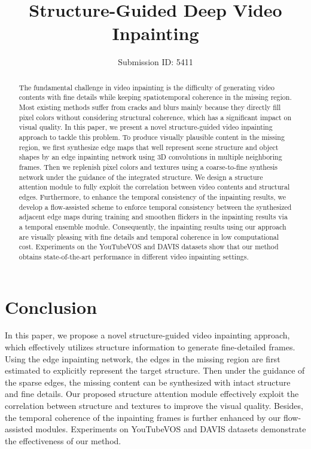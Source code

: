 \documentclass[letterpaper]{article} %
\title{Structure-Guided Deep Video Inpainting}
\author{Submission ID: 5411}
\begin{document}
\maketitle

\begin{abstract}
The fundamental challenge in video inpainting is the difficulty of generating video contents with fine details while keeping spatiotemporal coherence in the missing region. 
Most existing methods suffer from cracks and blurs mainly because they directly fill pixel colors without considering structural coherence, which has a significant impact on visual quality. 
In this paper, we present a novel structure-guided video inpainting approach to tackle this problem. 
To produce visually plausible content in the missing region, we first synthesize edge maps that well represent scene structure and object shapes by an edge inpainting network using 3D convolutions in multiple neighboring frames. 
Then we replenish pixel colors and textures using a coarse-to-fine synthesis network under the guidance of the integrated structure. 
We design a structure attention module to fully exploit the correlation between video contents and structural edges. 
Furthermore, to enhance the temporal consistency of the inpainting results, we develop a flow-assisted scheme to enforce temporal consistency between the synthesized adjacent edge maps during training and smoothen flickers in the inpainting results via a temporal ensemble module. 
Consequently, the inpainting results using our approach are visually pleasing with fine details and temporal coherence in low computational cost. 
Experiments on the YouTubeVOS and DAVIS datasets show that our method obtains state-of-the-art performance in different video inpainting settings.

\end{abstract}


 





\section{Conclusion}
In this paper, we propose a novel structure-guided video inpainting approach, which effectively utilizes structure information to generate fine-detailed frames.
Using the edge inpainting network, the edges in the missing region are first estimated to explicitly represent the target structure. 
Then under the guidance of the sparse edges, the missing content can be synthesized with intact structure and fine details.
%
Our proposed structure attention module effectively exploit the correlation between structure and textures to improve the visual quality.
%
Besides, the temporal coherence of the inpainting frames is further enhanced by our flow-assisted modules.
Experiments on YouTubeVOS and DAVIS datasets demonstrate the effectiveness of our method.

 

 
\end{document}
